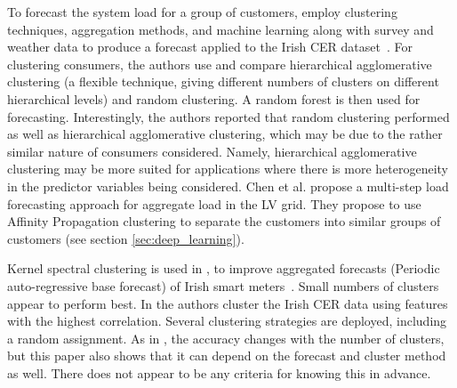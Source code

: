 To forecast the system load for a group of customers, \cite{Goehry2020ame} employ clustering techniques, aggregation methods, and machine learning along with survey and weather data to produce a forecast applied to the Irish CER dataset~\cite{Commission2012csm}. For clustering consumers, the authors use and compare hierarchical agglomerative clustering (a flexible technique, giving different numbers of clusters on different hierarchical levels) and random clustering. A random forest is then used for forecasting. 
Interestingly, the authors reported that random clustering performed as well as hierarchical agglomerative clustering, which may be due to the rather similar nature of consumers considered. Namely, hierarchical agglomerative clustering may be more suited for applications where there is more heterogeneity in the predictor variables being considered. Chen et al.\cite{chen2019daa} propose a multi-step load forecasting approach for aggregate load in the LV grid. They propose to use Affinity Propagation clustering to separate the customers into similar groups of customers (see section \ref{sec:deep_learning}).

Kernel spectral clustering is used in \cite{alzate2013iel}, to improve aggregated forecasts (Periodic auto-regressive base forecast) of Irish smart meters~\cite{Commission2012csm}. Small numbers of clusters appear to perform best. In \cite{kurniawan2015cba} the authors cluster the Irish CER data using features with the highest correlation.  Several clustering strategies are deployed, including a random assignment. As in \cite{alzate2013iel}, the accuracy changes with the number of clusters, but this paper also shows that it can depend on the forecast and cluster method as well. There does not appear to be any criteria for knowing this in advance.
